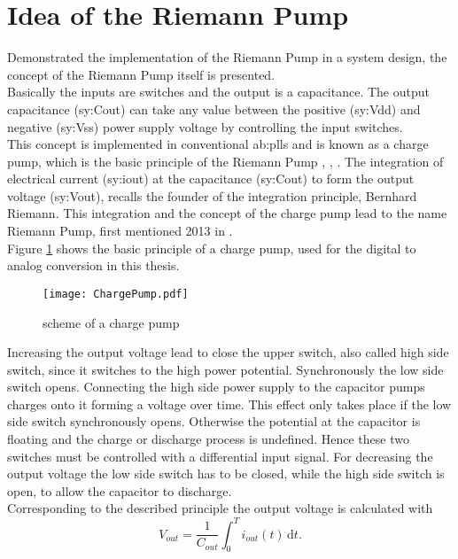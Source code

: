 \section{Idea of the Riemann Pump}
\label{IdeaRiemannPump}
Demonstrated the implementation of the Riemann Pump in a system design, the concept of the Riemann Pump itself is presented.\\
Basically the inputs are switches and the output is a capacitance.
The output capacitance (\gls{sy:Cout}) can take any value between the positive (\gls{sy:Vdd}) and negative (\gls{sy:Vss}) power supply voltage by controlling the input switches.\\
This concept is implemented in conventional \glspl{ab:pll} and is known as a charge pump, which is the basic principle of the Riemann Pump \cite{DevalRivetVeyracEtAl2013}, \cite{VeyracRivetDevalEtAl2014}, \cite{DevalRivetVeyrac2015}.
 The integration of electrical current (\gls{sy:iout}) at the capacitance (\gls{sy:Cout}) to form the output voltage  (\gls{sy:Vout}), recalls the founder of the integration principle, Bernhard Riemann.
This integration and the concept of the charge pump lead to the name Riemann Pump, first mentioned 2013 in \cite{DevalRivetVeyracEtAl2013}. \\
Figure \ref{fig:ChargePump} shows the basic principle of a charge pump, used for the digital to analog conversion in this thesis.

\begin{figure}[ht]
	\centering
  \texttt{[image: ChargePump.pdf]}
	\caption{scheme of a charge pump}
	\label{fig:ChargePump}
\end{figure}

Increasing the output voltage lead to close the upper switch, also called high side switch, since it switches to the high power potential.
Synchronously the low side switch opens.
Connecting the high side power supply to the capacitor pumps charges onto it forming a voltage over time.
This effect only takes place if the low side switch synchronously opens.
Otherwise the potential at the capacitor is floating and the charge or discharge process is undefined.
Hence these two switches must be controlled with a differential input signal.
For decreasing the output voltage the low side switch has to be closed, while the high side switch is open, to allow the capacitor to discharge.\\
Corresponding to the described principle the output voltage is calculated with 
\begin{equation}
	V_{out} = \frac{1}{C_{out}}{ \int_0^T \! i_{out}(t) \, \mathrm{d}t}.
\end{equation} %

